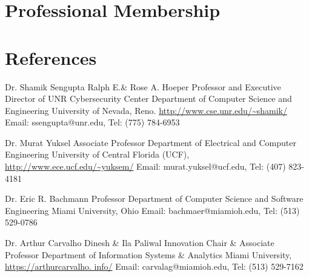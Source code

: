 \documentclass[11pt,letterpaper,sans]{moderncv}   %
\begin{document}
\section{Professional Membership}



\section{References}
	{Dr. Shamik Sengupta}
	{Ralph E.\& Rose A. Hoeper Professor and Executive Director of UNR Cybersecurity Center}
	{ Department of Computer Science and Engineering} 
	{University of Nevada, Reno. \url{http://www.cse.unr.edu/~shamik/}}
	{Email: ssengupta@unr.edu, Tel: (775) 784-6953}

	{Dr. Murat Yuksel}
	{Associate Professor} 
	{Department of Electrical and Computer Engineering} 
	{University of Central Florida (UCF), \url{http://www.ece.ucf.edu/~yuksem/}}
	{Email: murat.yuksel@ucf.edu, Tel: (407) 823-4181}
	
	{Dr. Eric R. Bachmann}
	{ Professor} 
	{Department of Computer Science and Software Engineering}
	{Miami University, Ohio}
	{Email: bachmaer@miamioh.edu, Tel: (513) 529-0786}
	
	{Dr. Arthur Carvalho} 
	{Dinesh \& Ila Paliwal Innovation Chair \& Associate Professor} 
	{Department of Information Systems \& Analytics}
	{Miami University, \url{https://arthurcarvalho. info/}}
	{Email: carvalag@miamioh.edu, Tel: (513) 529-7162}
\end{document}
